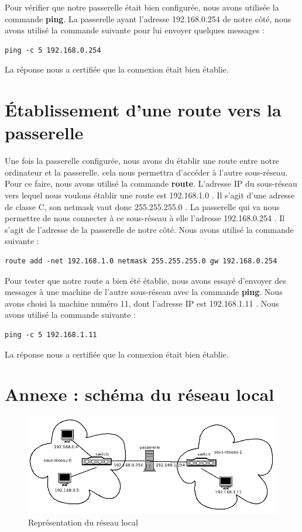 \documentclass{article}
\begin{document}
Pour vérifier que notre passerelle était bien configurée, nous avons utilisée la commande \textbf{ping}. La passerelle ayant l'adresse 192.168.0.254 de notre côté, nous avons utilisé la commande suivante pour lui envoyer quelques messages :
\begin{verbatim}
ping -c 5 192.168.0.254
\end{verbatim}
La réponse nous a certifiée que la connexion était bien établie.

\section{Établissement d'une route vers la passerelle}

Une fois la passerelle configurée, nous avons du établir une route entre notre ordinateur et la passerelle. cela nous permettra d'accéder à l'autre sous-réseau. Pour ce faire, nous avons utilisé la commande \textbf{route}. L'adresse IP du sous-réseau vers lequel nous voulons établir une route est 192.168.1.0 . Il s'agit d'une adresse de classe C, son netmask vaut donc 255.255.255.0 . La passerelle qui va nous permettre de nous connecter à ce sous-réseau à elle l'adresse 192.168.0.254 . Il s'agit de l'adresse de la passerelle de notre côté. Nous avons utilisé la commande suivante :
\begin{verbatim}
route add -net 192.168.1.0 netmask 255.255.255.0 gw 192.168.0.254
\end{verbatim}

Pour tester que notre route a bien été établie, nous avons essayé d'envoyer des messages à une machine de l'autre sous-réseau avec la commande \textbf{ping}. Nous avons choisi la machine numéro 11, dont l'adresse IP est 192.168.1.11 . Nous avons utilisé la commande suivante :
\begin{verbatim}
ping -c 5 192.168.1.11
\end{verbatim}
La réponse nous a certifiée que la connexion était bien établie.

\section{Annexe : schéma du réseau local}

\begin{figure}[h]
\centering
\includegraphics[scale=0.6]{reseau-tp1.png}
\caption{Représentation du réseau local}
\end{figure}
\end{document}
